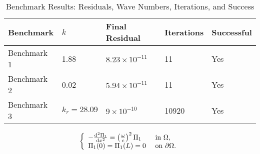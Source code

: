 \documentclass{article}[a4paper, 12pt]
\begin{document}
\begin{table}[h!]
    \centering
    \caption{Benchmark Results: Residuals, Wave Numbers, Iterations, and Success}
    \label{tab:benchmark_results}
    \begin{tabular}{lllll}
    \toprule
    \textbf{Benchmark} & $k$ & \textbf{Final Residual} & \textbf{Iterations} & \textbf{Successful} \\
    \midrule
    Benchmark 1            & 1.88                      & $8.23 \times 10^{-11}$  & 11                  & Yes                 \\
    Benchmark 2            & 0.02                      & $5.94 \times 10^{-11}$  & 11                  & Yes                  \\
    Benchmark 3            & $k_r = 28.09$            & $9 \times 10^{-10}$  & 10920                & Yes                 \\
    \bottomrule
    \end{tabular}
\end{table}



$$ \left\{\begin{array} {l l} {-\frac{\mathrm{d}^{2} \Pi_{1}} {\mathrm{d} x^{2}}=\left( \frac{\omega} {c} \right)^{2} \Pi_{1}} & {\mathrm{~ i n ~} \Omega,} \\ {\Pi_{1} ( 0 )=\Pi_{1} ( L )=0} & {\mathrm{~ o n ~} \partial\Omega.} \\ \end{array} \right.
$$
\end{document}
